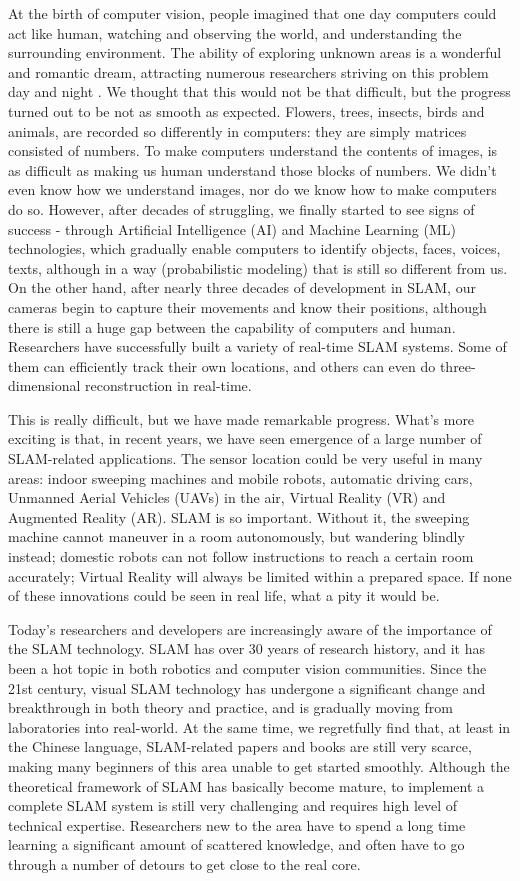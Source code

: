 At the birth of computer vision, people imagined that one day computers could act like human, watching and observing the world, and understanding the surrounding environment. The ability of exploring unknown areas is a wonderful and romantic dream, attracting numerous researchers striving on this problem day and night \cite{Hartyley2003}. We thought that this would not be that difficult, but the progress turned out to be not as smooth as expected. Flowers, trees, insects, birds and animals, are recorded so differently in computers: they are simply matrices consisted of numbers. To make computers understand the contents of images, is as difficult as making us human understand those blocks of numbers. We didn't even know how we understand images, nor do we know how to make computers do so. However, after decades of struggling,  we finally started to see signs of success - through Artificial Intelligence (AI) and Machine Learning (ML) technologies, which gradually enable computers to identify objects, faces, voices, texts, although in a way (probabilistic modeling) that is still so different from us. On the other hand, after nearly three decades of development in SLAM, our cameras begin to capture their movements and know their positions, although there is still a huge gap between the capability of computers and human. Researchers have successfully built a variety of real-time SLAM systems. Some of them can efficiently track their own locations, and others can even do three-dimensional reconstruction in real-time.

This is really difficult, but we have made remarkable progress. What's more exciting is that, in recent years, we have seen emergence of a large number of SLAM-related applications. The sensor location could be very useful in many areas: indoor sweeping machines and mobile robots, automatic driving cars, Unmanned Aerial Vehicles (UAVs) in the air, Virtual Reality (VR) and Augmented Reality (AR). SLAM is so important. Without it, the sweeping machine cannot maneuver in a room autonomously, but wandering blindly instead; domestic robots can not follow instructions to reach a certain room accurately; Virtual Reality will always be limited within a prepared space. If none of these innovations could be seen in real life, what a pity it would be.

Today's researchers and developers are increasingly aware of the importance of the SLAM technology. SLAM has over 30 years of research history, and it has been a hot topic in both robotics and computer vision communities. Since the 21st century, visual SLAM technology has undergone a significant change and breakthrough in both theory and practice, and is gradually moving from laboratories into real-world. At the same time, we regretfully find that, at least in the Chinese language, SLAM-related papers and books are still very scarce, making many beginners of this area unable to get started smoothly. Although the theoretical framework of SLAM has basically become mature, to implement a complete SLAM system is still very challenging and requires high level of technical expertise. Researchers new to the area have to spend a long time learning a significant amount of scattered knowledge, and often have to go through a number of detours to get close to the real core.

